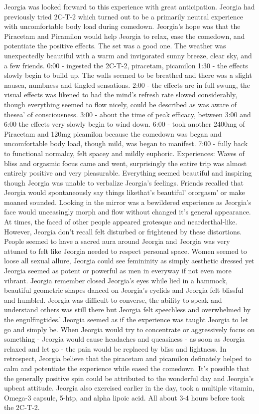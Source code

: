 \documentclass[12pt]{book}
\begin{document}
Jeorgia was looked forward to this experience with great anticipation. Jeorgia had previously tried 2C-T-2 which turned out to be a primarily neutral experience with uncomfortable body load during comedown. Jeorgia's hope was that the Piracetam and Picamilon would help Jeorgia to relax, ease the comedown, and potentiate the positive effects. The set was a good one. The weather was unexpectedly beautiful with a warm and invigorated sunny breeze, clear sky, and a few friends. 0:00 - ingested the 2C-T-2, piracetam, picamilon 1:30 - the effects slowly begin to build up. The walls seemed to be breathed and there was a slight nausea, numbness and tingled sensations. 2:00 - the effects are in full swung, the visual effects was likened to had the mind's refresh rate slowed considerably, though everything seemed to flow nicely, could be described as was aware of thesea' of consciousness. 3:00 - about the time of peak efficacy, between 3:00 and 6:00 the effects very slowly begin to wind down. 6:00 - took another 2400mg of Piracetam and 120mg picamilon because the comedown was began and uncomfortable body load, though mild, was began to manifest. 7:00 - fully back to functional normalcy, felt spacey and mildly euphoric. Experiences: Waves of bliss and orgasmic focus came and went, surprisingly the entire trip was almost entirely positive and very pleasurable. Everything seemed beautiful and inspiring though Jeorgia was unable to verbalize Jeorgia's feelings. Friends recalled that Jeorgia would spontaneously say things likethat's beautiful' ororgasm' or make moaned sounded. Looking in the mirror was a bewildered experience as Jeorgia's face would unceasingly morph and flow without changed it's general appearance. At times, the faced of other people appeared grotesque and nearderthal-like. However, Jeorgia don't recall felt disturbed or frightened by these distortions. People seemed to have a sacred aura around Jeorgia and Jeorgia was very attuned to felt like Jeorgia needed to respect personal space. Women seemed to loose all sexual allure, Jeorgia could see femininity as simply aesthetic dressed yet Jeorgia seemed as potent or powerful as men in everyway if not even more vibrant. Jeorgia remember closed Jeorgia's eyes while lied in a hammock, beautiful geometric shapes danced on Jeorgia's eyelids and Jeorgia felt blissful and humbled. Jeorgia was difficult to converse, the ability to speak and understand others was still there but Jeorgia felt speechless and overwhelmed by the engulfingtides.' Jeorgia seemed as if the experience was taught Jeorgia to let go and simply be. When Jeorgia would try to concentrate or aggressively focus on something - Jeorgia would cause headaches and queasiness - as soon as Jeorgia relaxed and let go - the pain would be replaced by bliss and lightness. In retrospect, Jeorgia believe that the piracetam and picamilon definately helped to calm and potentiate the experience while eased the comedown. It's possible that the generally positive spin could be attributed to the wonderful day and Jeorgia's upbeat attitude. Jeorgia also exercised earlier in the day, took a multiple vitamin, Omega-3 capsule, 5-htp, and alpha lipoic acid. All about 3-4 hours before took the 2C-T-2.
\end{document}
